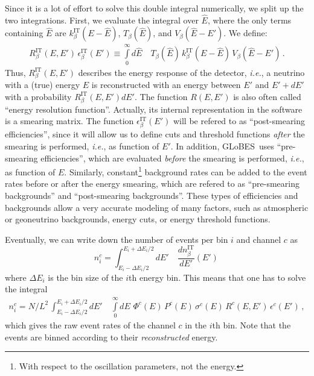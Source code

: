 \documentclass[12pt,a4paper]{article}
\newcommand{\ie}{{\it i.e.}}
\newcommand{\GLOBES}{{\sf GLoBES}}
\begin{document}
Since it is a lot of effort to solve this double integral numerically,
we split up the two integrations. First, we evaluate the integral over
$\hat{E}$, where the only terms containing $\hat{E}$ are
$k_\beta^{\text{IT}}(E-\hat{E})$,  $ T_\beta(\hat{E})$, and 
$ V_\beta(\hat{E}-E')$. We define:
\begin{eqnarray}
\label{equ:e_res} 
R_\beta^{\text{IT}}(E,E')\,\epsilon_\beta^{\text{IT}}(E')
 \equiv
\int\limits_0^\infty d\hat{E} \quad T_\beta(\hat{E})\,k_\beta^{\text{IT}}(E-\hat{E})
\,V_\beta(\hat{E}-E')\,. 
\end{eqnarray}
Thus, $R_\beta^{\text{IT}}(E,E')$ describes the energy response of 
the detector, \ie , a neutrino with a (true) energy $E$ is reconstructed
with an energy between $E'$ and $E'+dE'$ with a probability
$R_\beta^{\text{IT}}(E,E') dE'$. The function $R(E,E')$ is also often called ``energy resolution function''. Actually, its internal representation
in the software is a smearing matrix. The function $\epsilon_\beta^{\text{IT}}(E')$ will be refered to as ``post-smearing efficiencies'', since it will allow us to define cuts and threshold functions {\em after} the smearing is performed, \ie, as function of $E'$. 
In addition, \GLOBES\ uses ``pre-smearing efficiencies'', which are 
evaluated {\em before} the smearing is performed, \ie, as function of $E$.
Similarly, constant\footnote{With respect to the oscillation parameters, 
not the energy.} background rates can be added to the event rates before or 
after the energy smearing, which are refered to as 
``pre-smearing backgrounds'' and ``post-smearing backgrounds''. These types of 
efficiencies and backgrounds allow a very accurate modeling of
many factors, such as atmospheric or geoneutrino backgrounds, energy cuts, or
energy threshold functions.

Eventually, we can write down the number of events per bin $i$  and channel $c$ as
\begin{equation}
\label{equ:channel}
n_i^c=\int_{E_i-\Delta E_i/2}^{E_i+\Delta E_i/2} dE' \quad
\frac{dn_{\beta}^{\text{IT}}}{dE'} (E') \,
\end{equation}
where $\Delta E_i$ is the bin size of the $i$th energy bin.
This means that one has to solve the integral
\begin{eqnarray}
\label{equ:events_bin}
n_i^c=N/L^2\,\int_{E_i-\Delta E_i/2}^{E_i+\Delta E_i/2} dE' 
\quad \int\limits_0^\infty dE \,\, \Phi^c(E)\,
P^c(E)\,
\sigma^c(E)\,
R^c(E,E')\,
\epsilon^c(E')\,,
\end{eqnarray} 
which gives the raw event rates of the channel $c$ in the $i$th bin.
Note that the events are binned according to their \emph{reconstructed} energy.
\end{document}

